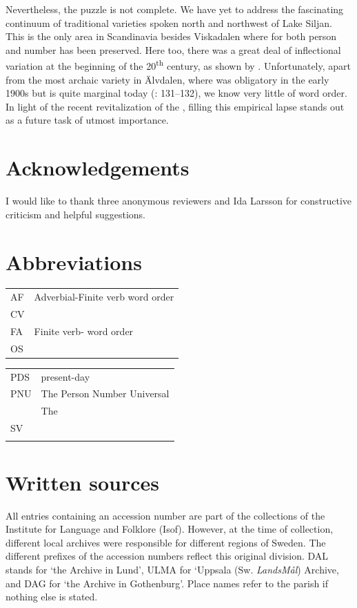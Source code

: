 \documentclass[output=paper,colorlinks,citecolor=brown,draft,draftmode]{langscibook}
\begin{document}
Nevertheless, the puzzle is not complete. We have yet to address the fascinating continuum of traditional  varieties spoken north and northwest of Lake Siljan. This is the only  area in Scandinavia besides Viskadalen where  for both person and number has been preserved. Here too, there was a great deal of inflectional variation at the beginning of the 20\textsuperscript{th} century, as shown by \citet[163--165]{Levander1928}. Unfortunately, apart from the most archaic variety in Älvdalen, where  was obligatory in the early 1900s \citep[124]{Levander1909} but is quite marginal today (\citealt{Garbacz2010}: 131–132), we know very little of  word order. In light of the recent revitalization of the , filling this empirical lapse stands out as a future task of utmost importance.


\section*{Acknowledgements}


I would like to thank three anonymous reviewers and Ida Larsson for constructive criticism and helpful suggestions.


\section*{Abbreviations}
\begin{tabularx}{.5\textwidth}{@{}lQ}
AF  &  Adverbial-Finite verb word order \\
CV  &                \\
FA  &  Finite verb- word order \\
OS  &                        \\
\end{tabularx}%
\begin{tabularx}{.5\textwidth}{lQ@{}}
PDS  &  present-day                \\
PNU  &  The Person Number Universal       \\
  &  The      \\
SV   &                \\
     & \\
\end{tabularx}

\section*{Written sources}
All entries containing an accession number are part of the collections of the Institute for Language and Folklore (Isof). However, at the time of collection, different local  archives were responsible for different regions of Sweden. The different prefixes of the accession numbers reflect this original division. DAL stands for ‘the  Archive in Lund’, ULMA for ‘Uppsala  (Sw. \textit{LandsMål}) Archive, and DAG for ‘the  Archive in Gothenburg’. Place names refer to the parish if nothing else is stated.
\end{document}

